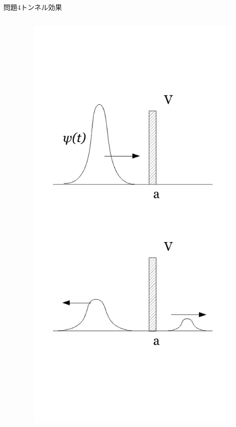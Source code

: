 \documentclass[dvipdfmx]{beamer}
\begin{document}
\begin{frame}{問題4}{トンネル効果}
\begin{columns}[t]
\begin{column}{0.7\textwidth}
\end{column}
\begin{column}{0.3\textwidth}
\begin{figure}[htbp]
    \centering
    \includegraphics[bb=0mm 0mm 100.0mm 170.0mm, scale=0.35, type=pdf]{img/problem4.pdf}
\end{figure}
\end{column}
\end{columns}
\end{frame}
\end{document}
